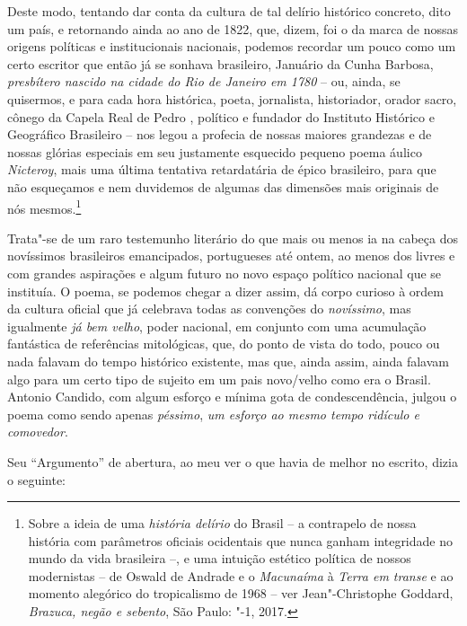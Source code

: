 Deste modo, tentando dar conta da cultura de tal delírio histórico
concreto, dito um país, e retornando ainda ao ano de 1822, que, dizem,
foi o da marca de nossas origens políticas e institucionais nacionais,
podemos recordar um pouco como um certo escritor que então já se sonhava
brasileiro, Januário da Cunha Barbosa, \emph{presbítero nascido na
cidade do Rio de Janeiro em 1780} -- ou, ainda, se quisermos, e para
cada hora histórica, poeta, jornalista, historiador, orador sacro,
cônego da Capela Real de Pedro , político e fundador do Instituto
Histórico e Geográfico Brasileiro -- nos legou a profecia de nossas
maiores grandezas e de nossas glórias especiais em seu justamente
esquecido pequeno poema áulico \emph{Nicteroy}, mais uma última
tentativa retardatária de épico brasileiro, para que não esqueçamos e
nem duvidemos de algumas das dimensões mais originais de nós
mesmos.\footnote{Sobre a ideia de uma \emph{história delírio} do Brasil
  -- a contrapelo de nossa história com parâmetros oficiais ocidentais
  que nunca ganham integridade no mundo da vida brasileira --, e uma
  intuição estético política de nossos modernistas -- de Oswald de
  Andrade e o \emph{Macunaíma} à \emph{Terra em transe} e ao momento
  alegórico do tropicalismo de 1968 -- ver Jean"-Christophe Goddard,
  \emph{Brazuca, negão e sebento}, São Paulo: "-1, 2017.}

Trata"-se de um raro testemunho literário do que mais ou menos ia na
cabeça dos novíssimos brasileiros emancipados, portugueses até ontem, ao
menos dos livres e com grandes aspirações e algum futuro no novo espaço
político nacional que se instituía. O poema, se podemos chegar a dizer
assim, dá corpo curioso à ordem da cultura oficial que já celebrava
todas as convenções do \emph{novíssimo}, mas igualmente \emph{já bem
velho}, poder nacional, em conjunto com uma acumulação fantástica de
referências mitológicas, que, do ponto de vista do todo, pouco ou nada
falavam do tempo histórico existente, mas que, ainda assim, ainda
falavam algo para um certo tipo de sujeito em um pais novo/velho como
era o Brasil. Antonio Candido, com algum esforço e mínima gota de
condescendência, julgou o poema como sendo apenas \emph{péssimo},
\emph{um esforço ao mesmo tempo ridículo e comovedor}.

Seu ``Argumento'' de abertura, ao meu ver o que havia de melhor no
escrito, dizia o seguinte:

